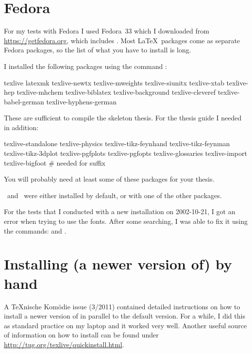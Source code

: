 \section{Fedora}%
\label{sec:app:fedora}

For my tests with Fedora I used Fedora~33 which I downloaded from
\url{https://getfedora.org},
which includes .
Most \LaTeX\ packages come as separate Fedora packages,
so the list of what you have to install is long.

I installed the following packages using the command :
\begin{bashlisting}
texlive
latexmk
texlive-newtx
texlive-mweights
texlive-siunitx
texlive-xtab
texlive-hep
texlive-mhchem
texlive-biblatex
texlive-background
texlive-cleveref
texlive-babel-german
texlive-hyphens-german
\end{bashlisting}

These are sufficient to compile the skeleton thesis.
For the thesis guide I needed in addition:
\begin{bashlisting}
texlive-standalone
texlive-physics
texlive-tikz-feynhand
texlive-tikz-feynman
texlive-tikz-3dplot
texlive-pgfplots
texlive-pgfopts
texlive-glossaries
texlive-import
texlive-bigfoot # needed for suffix
\end{bashlisting}
You will probably need at least some of these packages for your thesis.

\LuaLaTeX\ and \XeLaTeX\ were either installed by default,
or with one of the other packages.

For the tests that I conducted with a new installation on 2002-10-21,
I got an error when trying to use the  fonts.
After some searching, I was able to fix it using the commands:
 and .

  
\section{Installing (a newer version of) \TeXLive by hand}%
\label{sec:app:texlive}

A \TeX nische Komödie issue (3/2011) contained detailed instructions on
how to install a newer version of \TeXLive in parallel to the
default version.
For a while, I did this as standard practice on my laptop and it worked very well.
Another useful source of information on how to install \TeXLive can be found under
\url{http://tug.org/texlive/quickinstall.html}.

